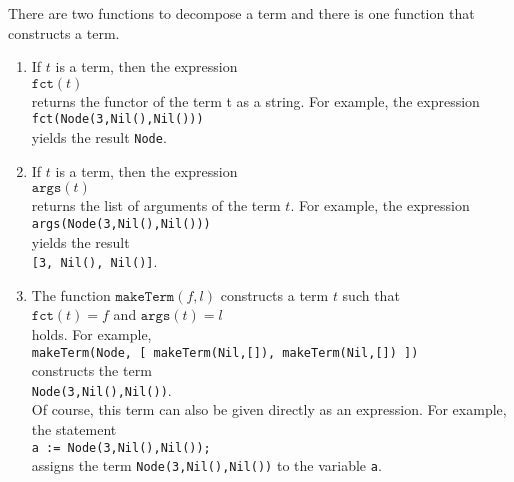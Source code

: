 There are two functions to decompose a term and there is one function that constructs a term.
\begin{enumerate}
\item If $t$ is a term, then the expression
      \\[0.2cm]
      \hspace*{1.3cm}
      $\texttt{fct}(t)$
      \\[0.2cm]
      returns the functor of the term t as a string.  For example, the expression
      \\[0.2cm]
      \hspace*{1.3cm}
      \texttt{fct(Node(3,Nil(),Nil()))}
      \\[0.2cm]
      yields the result \texttt{Node}.
\item If $t$ is a term, then the expression
      \\[0.2cm]
      \hspace*{1.3cm}
      $\mathtt{args}(t)$
      \\[0.2cm]
      returns the list of arguments of the term $t$.  For example, the expression
      \\[0.2cm]
      \hspace*{1.3cm}
      \texttt{args(Node(3,Nil(),Nil()))}
      \\[0.2cm]
      yields the result 
      \\[0.2cm]
      \hspace*{1.3cm}
      \texttt{[3, Nil(), Nil()]}.
\item The function $\texttt{makeTerm}(f,l)$ constructs a term $t$ such that
      \\[0.2cm]
      \hspace*{1.3cm}
      $\mathtt{fct}(t) = f$  \quad and \quad $\mathtt{args}(t) = l$
      \\[0.2cm]
      holds.  For example,
      \\[0.2cm]
      \hspace*{1.3cm}
      \texttt{makeTerm(Node, 
             [ makeTerm(Nil,[]), makeTerm(Nil,[]) ])}
      \\[0.2cm]
      constructs the term
      \\[0.2cm]
      \hspace*{1.3cm}
      \texttt{Node(3,Nil(),Nil())}.
      \\[0.2cm]
      Of course,  this term can also be given directly as an expression.  For example, the
      statement 
      \\[0.2cm]
      \hspace*{1.3cm}
      \texttt{a := Node(3,Nil(),Nil());}
      \\[0.2cm]
      assigns the term \texttt{Node(3,Nil(),Nil())} to the variable \texttt{a}.
\end{enumerate}


